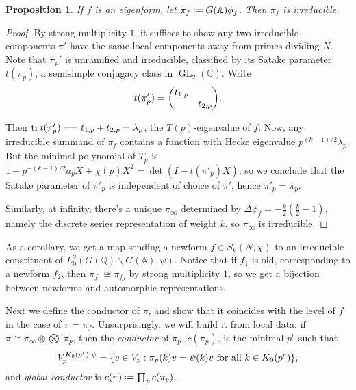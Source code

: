 \documentclass[11pt]{report}
\let\mbb\mathbb
\newcommand{\1}{\mathbbm 1}
\newcommand{\Q}{\mathbb{Q}}
\newcommand{\C}{\mathbb{C}}
\newcommand{\A}{\mbb A}
\newcommand*{\defeq}{\mathrel{\vcenter{\baselineskip0.5ex \lineskiplimit0pt
      \hbox{\scriptsize.}\hbox{\scriptsize.}}}%
  =}
\DeclareMathOperator{\GL}{GL}
\theoremstyle{plain}
\newcounter{ex}
\newtheorem{prop}[thm]{Proposition}
\theoremstyle{definition}
\theoremstyle{remark}
\numberwithin{equation}{section}
\begin{document}
\begin{prop}
  If $f$ is an eigenform, let $\pi_{f} \defeq G(\A) \phi_{f}$. Then
  $\pi_{f}$ is irreducible.
\end{prop}

\begin{proof}
  By strong multiplicity $1$, it suffices to show any two irreducible
  components $\pi'$ have
  the same local components away from primes dividing $N$. 
  Note that $\pi_{p}'$ is unramified and
  irreducible, classified by its Satake parameter
  $t(\pi_{p})$, a semisimple conjugacy class in $\GL_{2}(\C)$. Write
  \begin{equation}
    \label{eq:22}
t(\pi_{p}') = \mqty(t_{1,p}  &  \\  & t_{2,p}).
  \end{equation}

  Then $\tr t(\pi_{p}') = = t_{1,p} + t_{2,p} = \lambda_{p}$, the
  $T(p)$-eigenvalue of $f$. Now, any irreducible summand of $\pi_{f}$
  contains a function with Hecke eigenvalue $p^{(k-1)/2}\lambda_{p}$. But
  the minimal polynomial of $T_{p}$ is
  $1 - p^{-(k-1)/2}a_{p}X + \chi(p)X^{2} = \det(I - t(\pi'_{p})X)$, so we
  conclude that the Satake parameter of $\pi'_{p}$ is independent of
  choice of $\pi'$, hence $\pi'_{p}= \pi_{p}$. 

  Similarly, at infinity, there's a unique $\pi_{\infty}$ determined by
  $\Delta\phi_{f} = -\frac{k}{2}(\frac{k}{2}-1)$, namely the discrete series
  representation of weight $k$, so $\pi_{\infty}$ is irreducible. 
\end{proof}

As a corollary, we get a map sending a newform $f \in S_{k}(N,\chi)$
to an irreducible constituent of $L^{2}_{0}(G(\Q)\backslash G(\A),\psi)$. Notice
that if $f_{1}$ is old, corresponding to a newform $f_{2}$, then
$\pi_{f_{1}} \cong \pi_{f_{2}}$ by strong multiplicity $1$, so we get a
bijection between newforms and automorphic representations.

Next we define the conductor of $\pi$, and show that it coincides with
the level of $f$ in the case of $\pi = \pi_{f}$. Unsurprisingly, we will
build it from local data: if $\pi \cong \pi_{\infty} \otimes \bigotimes{}^{\! '}\pi_{p}$,
then the \emph{conductor} of $\pi_{p}$,  $c(\pi_{p})$, is the
minimal $p^{r}$ such that
\begin{equation}
  \label{eq:23}
  V_{p}^{K_{0}(p^{r}),\psi} = \qty{v \in V_{p} : \pi_{p}(k)v = \psi(k)v \text{ for
      all } k \in K_{0}(p^{r}) },
\end{equation}
and \emph{global conductor} is $c(\pi) \defeq \prod_{p}c(\pi_{p})$.
\end{document}
